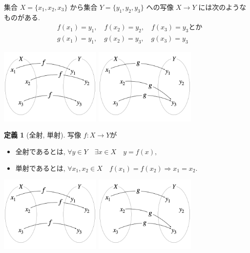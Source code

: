 \documentclass[11pt, a4paper, dvipdfmx]{jsarticle}
\theoremstyle{definition}
\newtheorem{Definition}[Axiom]{定義}
\theoremstyle{mystyle}
\numberwithin{equation}{section} %
\begin{document}
集合 $X = \{x_1,x_2,x_3\}$ から集合 $Y= \{y_1,y_2,y_3\}$
への写像 $X \to Y$ には次のようなものがある. 
\begin{align*}
    &f(x_1)=y_1,\quad f(x_2)=y_2,\quad f(x_3)=y_3 \text{とか}\\
    &g(x_1)=y_1,\quad g(x_2)=y_3,\quad g(x_3)=y_3 
\end{align*}
\begin{center}
    \includegraphics[width=5cm]{mapping/mapping1.png}
    \includegraphics[width=5cm]{mapping/mapping2.png}
\end{center}

\begin{Definition}[全射, 単射]
    写像 $f\colon X \to Y$が
    \begin{itemize}
        \item 全射であるとは, 
        $\forall y\in Y\quad \exists x\in X\quad  y = f(x),$
        \item 単射であるとは, 
        $\forall x_1,x_2\in X\quad f(x_1) = f(x_2) \Rightarrow x_1 = x_2.$
    \end{itemize}
\end{Definition}

\begin{center}
    \includegraphics[width=5cm]{mapping/mapping1.png}
    \includegraphics[width=5cm]{mapping/mapping2.png}
\end{center}
\end{document}
